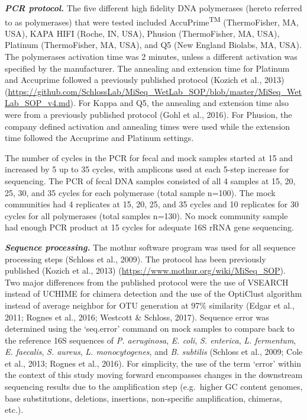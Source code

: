 \documentclass[11pt,]{article}
\begin{document}
\textbf{\emph{PCR protocol.}} The five different high fidelity DNA
polymerases (hereto referred to as polymerases) that were tested
included AccuPrime\textsuperscript{TM} (ThermoFisher, MA, USA), KAPA
HIFI (Roche, IN, USA), Phusion (ThermoFisher, MA, USA), Platinum
(ThermoFisher, MA, USA), and Q5 (New England Biolabs, MA, USA). The
polymerases activation time was 2 minutes, unless a different activation
was specified by the manufacturer. The annealing and extension time for
Platinum and Accuprime followed a previously published protocol (Kozich
et al., 2013)
(\url{https://github.com/SchlossLab/MiSeq_WetLab_SOP/blob/master/MiSeq_WetLab_SOP_v4.md}).
For Kappa and Q5, the annealing and extension time also were from a
previously published protocol (Gohl et al., 2016). For Phusion, the
company defined activation and annealing times were used while the
extension time followed the Accuprime and Platinum settings.

The number of cycles in the PCR for fecal and mock samples started at 15
and increased by 5 up to 35 cycles, with amplicons used at each 5-step
increase for sequencing. The PCR of fecal DNA samples consisted of all 4
samples at 15, 20, 25, 30, and 35 cycles for each polymerase (total
sample n=100). The mock communities had 4 replicates at 15, 20, 25, and
35 cycles and 10 replicates for 30 cycles for all polymerases (total
samples n=130). No mock community sample had enough PCR product at 15
cycles for adequate 16S rRNA gene sequencing.

\textbf{\emph{Sequence processing.}} The mothur software program was
used for all sequence processing steps (Schloss et al., 2009). The
protocol has been previously published (Kozich et al., 2013)
(\url{https://www.mothur.org/wiki/MiSeq_SOP}). Two major differences
from the published protocol were the use of VSEARCH instead of UCHIME
for chimera detection and the use of the OptiClust algorithm instead of
average neighbor for OTU generation at 97\% similarity (Edgar et al.,
2011; Rognes et al., 2016; Westcott \& Schloss, 2017). Sequence error
was determined using the `seq.error' command on mock samples to compare
back to the reference 16S sequences of \emph{P. aeruginosa}, \emph{E.
coli}, \emph{S. enterica}, \emph{L. fermentum}, \emph{E. faecalis},
\emph{S. aureus}, \emph{L. monocytogenes}, and \emph{B. subtilis}
(Schloss et al., 2009; Cole et al., 2013; Rognes et al., 2016). For
simplicity, the use of the term `error' within the context of this study
moving forward encompasses changes in the downstream sequencing results
due to the amplification step (e.g.~higher GC content genomes, base
substitutions, deletions, insertions, non-specific amplification,
chimeras, etc.).
\end{document}
